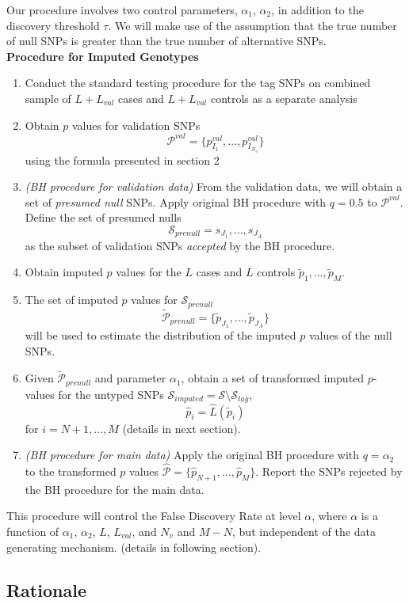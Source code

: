 \documentclass[12pt]{article}
\begin{document}
Our procedure involves two control parameters, $\alpha_1$,
$\alpha_2$, in addition to the discovery threshold
$\tau$.
We will make use of the assumption that the true number of null SNPs
is greater than the true number of alternative SNPs.
\[\]
\noindent\textbf{Procedure for Imputed Genotypes}
\begin{enumerate}
\item Conduct the standard testing procedure for the tag SNPs on combined
sample of $L+L_{val}$ cases and $L+L_{val}$ controls as a separate analysis
\item Obtain $p$ values for validation SNPs
\[\mathcal{P}^{val} = \{p^{val}_{I_1},\hdots,p^{val}_{I_{N_v}}\}\]
using the formula presented in section 2
\item \emph{(BH procedure for validation data)} From the validation data, we will obtain a set of
  \emph{presumed null} SNPs.
Apply original BH procedure\cite{Benjamini1995} with $q=0.5$ to $\mathcal{P}^{val}$.
Define the set of presumed nulls 
\[\mathcal{S}_{prenull} = s_{J_1},\hdots,s_{J_A}\]
as the subset of validation SNPs \emph{accepted} by the BH procedure.
\item Obtain imputed $p$ values for the $L$ cases and $L$ controls
  $\tilde{p}_1,\hdots,\tilde{p}_M$.
\item The set of imputed $p$ values for $\mathcal{S}_{prenull}$
\[
\tilde{\mathcal{P}}_{prenull} = \{\tilde{p}_{J_1},\hdots,\tilde{p}_{J_A}\}
\]
will be used to estimate the distribution of the imputed $p$ values
of the null SNPs.
\item Given $\tilde{\mathcal{P}}_{prenull}$ and parameter $\alpha_1$,
obtain a set of transformed imputed $p$-values for the untyped
  SNPs $\mathcal{S}_{imputed} = \mathcal{S}\setminus\mathcal{S}_{tag}$,
\[
\hat{p}_i = \hat{L}(\tilde{p}_i)
\]
for $i = N+1,\hdots,M$ (details in next section).
\item \emph{(BH procedure for main data)} Apply the original BH procedure with $q =\alpha_2$ to the
  transformed $p$ values $\hat{\mathcal{P}} =
  \{\hat{p}_{N+1},\hdots,\hat{p}_M\}.$
Report the SNPs rejected by the BH procedure for the main data.
\end{enumerate}
This procedure will control the False Discovery Rate at level
$\alpha$,
where $\alpha$ is a function of $\alpha_1$, $\alpha_2$, $L$,
$L_{val}$, and $N_v$ and $M-N$, but independent of the data generating mechanism.
 (details in following section).


\subsection{Rationale}
\end{document}
